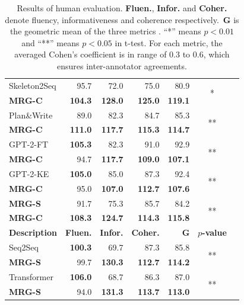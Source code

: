 \documentclass[letterpaper]{article} %
\begin{document}
\begin{table}[t]
{\begin{tabular}{|l|r|r|r|r|c|c|}
     Skeleton2Seq & 95.7 &  72.0 & 75.0  & 80.9 &\multirow{2}{*}{*} \\
      \textbf{MRG-C}  & \textbf{104.3}  & \textbf{128.0} & \textbf{125.0} & \textbf{119.1}&\\
  \hline
      Plan\&Write  & 89.0 &  82.3 & 84.7 & 85.3 &\multirow{2}{*}{**} \\
      \textbf{MRG-C}  & \textbf{111.0}  & \textbf{117.7} & \textbf{115.3} & \textbf{114.7}&\\
  \hline
      GPT-2-FT & \textbf{ 105.3} & 82.3  & 91.0  & 92.9 &\multirow{2}{*}{**} \\
      \textbf{MRG-C}  & 94.7  & \textbf{117.7} & \textbf{109.0} & \textbf{107.1}&\\
  \hline
       GPT-2-KE & \textbf{ 105.0} & 85.0  & 87.3  & 92.4 &\multirow{2}{*}{**} \\
      \textbf{MRG-C}  & 95.0  & \textbf{107.0} & \textbf{112.7} & \textbf{107.6}&\\
  \hline
      \textbf{MRG-S} & 91.7 & 75.3  & 85.7  & 84.2 &\multirow{2}{*}{**} \\
      \textbf{MRG-C}  & \textbf{108.3}  & \textbf{124.7} & \textbf{114.3} & \textbf{115.8}&\\
  \hline 
  \hline 
  \textbf{Description} & \textbf{Fluen.}  & \textbf{Infor.} & \textbf{Coher.}& \textbf{G}& \textbf{$p$-value} \\ 
    \hline
     Seq2Seq & \textbf{100.3} &  69.7 & 87.3 & 85.8 &\multirow{2}{*}{**} \\
      \textbf{MRG-S}  & 99.7  &  \textbf{130.3} & \textbf{112.7} & \textbf{114.2} &\\
  \hline
     Transformer & \textbf{106.0} & 68.7  & 86.3 & 87.0 & \multirow{2}{*}{**}\\
      \textbf{MRG-S}  & 94.0  &  \textbf{131.3} &  \textbf{113.7} & \textbf{113.0} &\\
  \hline     
  \end{tabular}}
    \caption{Results of human evaluation. \textbf{Fluen.}, \textbf{Infor.} and \textbf{Coher.} denote fluency, informativeness and  coherence respectively.~\textbf{G} is the geometric mean of the three metrics . ``*'' means $p<0.01$ and ``**'' means $p<0.05$ in t-test. For each metric, the averaged Cohen's coefficient is in range of 0.3 to 0.6, which ensures inter-annotator agreements.} \label{tab:human evaluation}

\end{table}
\end{document}
